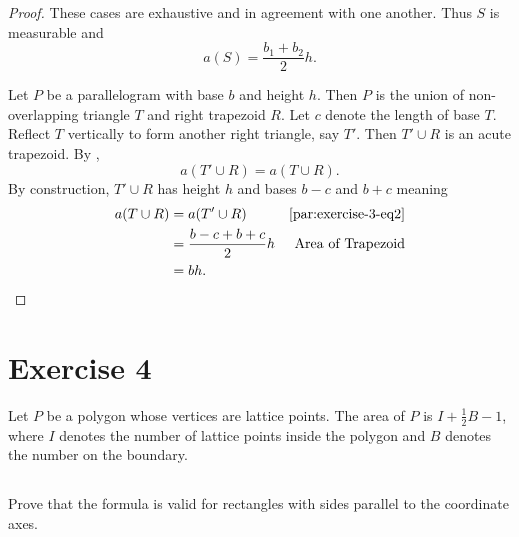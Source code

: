\documentclass{article}
\begin{document}
\begin{proof}
    These cases are exhaustive and in agreement with one another.
    Thus $S$ is measurable and $$a(S) = \frac{b_1 + b_2}{2}h.$$

  \divider

  Let $P$ be a parallelogram with base $b$ and height $h$.
  Then $P$ is the union of non-overlapping triangle $T$ and right trapezoid $R$.
  Let $c$ denote the length of base $T$.
  Reflect $T$ vertically to form another right triangle, say $T'$.
  Then $T' \cup R$ is an acute trapezoid.
  By ,
    \begin{equation}
      \label{par:exercise-3-eq2}
      \tag{3.2}
      a(T' \cup R) = a(T \cup R).
    \end{equation}
  By construction, $T' \cup R$ has height $h$ and bases $b - c$ and $b + c$
    meaning
    \begin{align*}
      a(T \cup R)
        & = a(T' \cup R) & \eqref{par:exercise-3-eq2} \\
        & = \frac{b - c + b + c}{2}h & \text{Area of Trapezoid} \\
        & = bh.
    \end{align*}

\end{proof}

\section*{Exercise 4}%
%

Let $P$ be a polygon whose vertices are lattice points.
The area of $P$ is $I + \frac{1}{2}B - 1$, where $I$ denotes the number of
  lattice points inside the polygon and $B$ denotes the number on the boundary.

\subsection*{}%
%

Prove that the formula is valid for rectangles with sides parallel to the
  coordinate axes.
\end{document}
